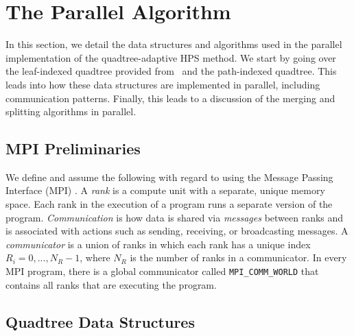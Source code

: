 \section{The Parallel Algorithm}
\label{sec:parallel-algorithm}

In this section, we detail the data structures and algorithms used in the parallel implementation of the quadtree-adaptive HPS method. We start by going over the leaf-indexed quadtree provided from \pforest\ and the path-indexed quadtree. This leads into how these data structures are implemented in parallel, including communication patterns. Finally, this leads to a discussion of the merging and splitting algorithms in parallel.

\subsection{MPI Preliminaries}

We define and assume the following with regard to using the Message Passing Interface (MPI) \citep{mpi40}. A {\em rank} is a compute unit with a separate, unique memory space. Each rank in the execution of a program runs a separate version of the program. {\em Communication} is how data is shared via {\em messages} between ranks and is associated with actions such as sending, receiving, or broadcasting messages. A {\em communicator} is a union of ranks in which each rank has a unique index $R_i = 0, ..., N_{R}-1$, where $N_R$ is the number of ranks in a communicator. In every MPI program, there is a global communicator called {\tt MPI\_COMM\_WORLD} that contains all ranks that are executing the program.

\subsection{Quadtree Data Structures}
\label{sub:quadtree-data-structures}

